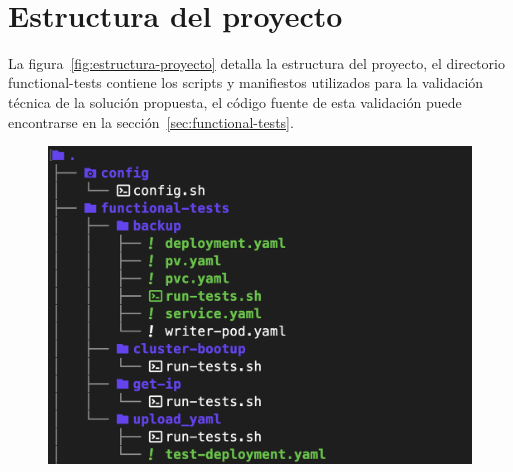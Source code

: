 \label{cap:pmv}
\mbox{}\\
\section{Estructura del proyecto}
\noindent
La figura~\ref{fig:estructura-proyecto} detalla la estructura del proyecto, el directorio functional-tests contiene los scripts y manifiestos utilizados para la validación técnica de la solución propuesta, el código fuente de esta validación puede encontrarse en la sección~\ref{sec:functional-tests}. 
\begin{figure}[H]
    \centering
    \begin{minipage}{0.48\textwidth}
        \centering
        \includegraphics[scale=0.35]{tablas-images/cp6/src/tree-1.png}
        \label{fig:estructura-proyecto-1}
    \end{minipage}
    \hfill
    \begin{minipage}{0.48\textwidth}
        \centering

\end{minipage}
\end{figure}
